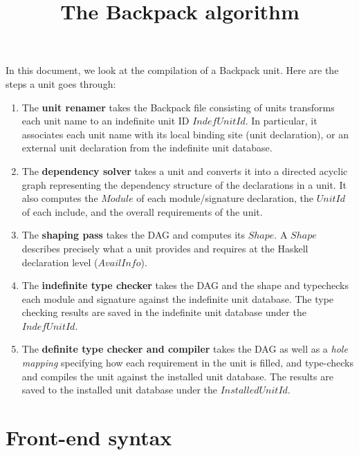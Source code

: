 \documentclass{article}
\title{The Backpack algorithm}
\newcommand{\I}[1]{\ensuremath{\mathit{#1}}}
\begin{document}
\maketitle

\noindent
In this document, we look at the compilation of a Backpack unit.
Here are the steps a unit goes through:

\begin{enumerate}
    \item The \textbf{unit renamer} takes the Backpack file consisting
    of units transforms each unit name to an indefinite unit ID \I{IndefUnitId}.
    In particular, it associates each unit name with its local binding
    site (unit declaration), or an external unit declaration from
    the indefinite unit database.

    \item The \textbf{dependency solver} takes a unit
    and converts it into a directed acyclic graph representing the
    dependency structure of the declarations in a unit.
    It also computes the \I{Module} of each module/signature
    declaration, the \I{UnitId} of each include, and the overall
    requirements of the unit.

    \item The \textbf{shaping pass} takes the DAG
    and computes its \I{Shape}.  A \I{Shape} describes precisely what
    a unit provides and requires at the Haskell declaration level (\I{AvailInfo}).

    \item The \textbf{indefinite type checker} takes the DAG and the shape
    and typechecks each module and signature against the indefinite unit
    database.  The type checking results are saved in the indefinite
    unit database under the \I{IndefUnitId}.

    \item The \textbf{definite type checker and compiler} takes the DAG as well as a
    \emph{hole mapping} specifying how each requirement in the unit
    is filled, and type-checks and compiles the unit against the
    installed unit database.  The results are saved to the installed unit database
    under the \I{InstalledUnitId}.
\end{enumerate}

\section{Front-end syntax}
\end{document}
